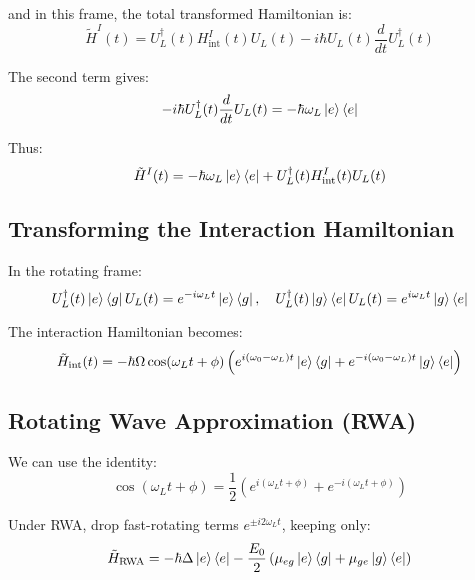 and in this frame, the total transformed Hamiltonian is:
\begin{equation}
	\tilde{H}^I(t) = U_L^\dagger(t) H_{\text{int}}^I(t) U_L(t) - i\hbar U_L(t) \frac{d}{dt} U_L^\dagger(t)
	\label{eq:TransformedHamiltonian}
\end{equation}

The second term gives:
\begin{equation}
	-i\hbar U_L^\dagger(t) \frac{d}{dt} U_L(t) = - \hbar \omega_L \ket{e}\bra{e}
	\label{eq:SecondTermHamiltonian}
\end{equation}

Thus:
\begin{equation}
	\tilde{H}^I(t) = - \hbar \omega_L \ket{e}\bra{e} + U_L^\dagger(t) H_{\text{int}}^I(t) U_L(t)
	\label{eq:FinalTransformedHamiltonian}
\end{equation}


\subsection*{Transforming the Interaction Hamiltonian}

In the rotating frame:
\begin{equation}
	U_L^\dagger(t) \ket{e}\bra{g} U_L(t) = e^{-i\omega_L t} \ket{e}\bra{g}, \quad
	U_L^\dagger(t) \ket{g}\bra{e} U_L(t) = e^{i\omega_L t} \ket{g}\bra{e}
	\label{eq:RotatingFrameOperators}
\end{equation}

The interaction Hamiltonian becomes:
\begin{equation}
	\tilde{H}_{\text{int}}(t) = -\hbar\Omega \cos(\omega_L t + \phi)\left(e^{i(\omega_0 - \omega_L)t} \ket{e}\bra{g} + e^{-i(\omega_0 - \omega_L)t} \ket{g}\bra{e} \right)
	\label{eq:TransformedInteractionHamiltonian}
\end{equation}

\subsection*{Rotating Wave Approximation (RWA)}
We can use the identity:
\begin{equation}
	\cos(\omega_L t + \phi) = \frac{1}{2}\left(e^{i(\omega_L t + \phi)} + e^{-i(\omega_L t + \phi)} \right)
\end{equation}

Under RWA, drop fast-rotating terms \(e^{\pm i2\omega_L t}\), keeping only:
\begin{equation}
	\tilde{H}_{\text{RWA}} = -\hbar \Delta \ket{e}\bra{e} - \frac{E_0}{2} \left(
	\mu_{eg} \ket{e}\bra{g} + \mu_{ge} \ket{g}\bra{e}
	\right)
	\label{eq:RWAHamiltonianFinal}
\end{equation}

